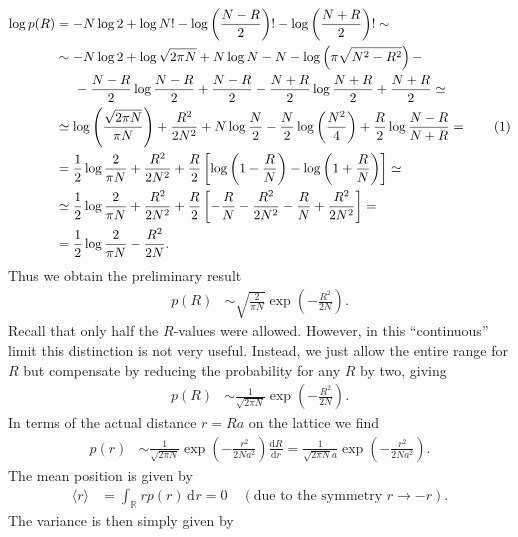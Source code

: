 \documentclass[english, parskip=full]{scrartcl}
\newcommand\numberthis{\addtocounter{equation}{1}\tag{\theequation}}
\renewcommand{\bra}{}
\newcommand{\intr}{}
\newcommand{\kla}{}
\newcommand{\klam}{}
\newcommand{\tecxt}{}
\begin{document}
\begin{align*}
\log p(R) &= -N\log 2 + \log N! - \log\kla\left( \frac{N-R}{2} \right)! - \log\kla\left( \frac{N+R}{2} \right)! \sim \\
&\sim -N\log2 + \log\sqrt{2\pi N} + N\log N - N - \log\kla\left( \pi \sqrt{N^2-R^2} \right) - \\
&\hspace{0.5cm} - \frac{N-R}{2}\log\frac{N-R}{2} + \frac{N-R}{2} - \frac{N+R}{2}\log\frac{N+R}{2} + \frac{N+R}{2} \simeq \\
&\simeq \log\kla\left( \frac{\sqrt{2\pi N}}{\pi N} \right) +\frac{R^2}{2N^2} + N\log \frac{N}{2} - \frac{N}{2}\log\kla\left( \frac{N^2}{4} \right) + \frac{R}{2}\log\frac{N-R}{N+R} = \numberthis \\
&= \frac{1}{2}\log \frac{2}{\pi N} +\frac{R^2}{2N^2} + \frac{R}{2} \klam\left[ \log\kla\left( 1 - \frac{R}{N} \right) - \log\kla\left( 1 + \frac{R}{N} \right) \right] \simeq \\
&\simeq \frac{1}{2}\log \frac{2}{\pi N} +\frac{R^2}{2N^2} + \frac{R}{2}\klam\left[ -\frac{R}{N} - \frac{R^2}{2N^2} - \frac{R}{N} + \frac{R^2}{2N^2} \right] = \\
&= \frac{1}{2}\log \frac{2}{\pi N} -\frac{R^2}{2N}.
\end{align*}
Thus we obtain the preliminary result
\begin{align}
p(R) &\sim \sqrt{\frac{2}{\pi N}} \exp\kla\left( -\frac{R^2}{2N} \right).
\end{align}
Recall that only half the $R$-values were allowed.
However, in this ``continuous'' limit this distinction is not very useful.
Instead, we just allow the entire range for $R$ but compensate by reducing the probability for any $R$ by two, giving
\begin{align}
p(R) &\sim \frac{1}{\sqrt{2\pi N}} \exp\kla\left( -\frac{R^2}{2N} \right).
\end{align}
In terms of the actual distance $r=Ra$ on the lattice we find
\begin{align}
p(r) &\sim \frac{1}{\sqrt{2\pi N}} \exp\kla\left( -\frac{r^2}{2Na^2} \right) \frac{\tecxt\text{d}R}{\tecxt\text{d}r} = \frac{1}{\sqrt{2\pi N}a} \exp\kla\left( -\frac{r^2}{2Na^2} \right).
\end{align}
The mean position is given by
\begin{align}
\bra\langle r \rangle &= \intr\int_{\mathbb{R}^{ }} rp(r) \, \mathrm{d}^{ }r = 0\quad (\tecxt\text{due to the symmetry }r\rightarrow -r).
\end{align}
The variance is then simply given by 
\end{document}
